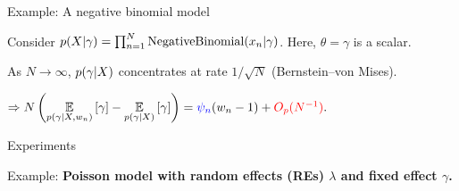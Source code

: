 

    



\begin{frame}[t]{Example: A negative binomial model}


Consider $p(X \vert \gamma) = \prod_{n=1}^N \textrm{NegativeBinomial}(x_n \vert \gamma)$. Here, $\theta = \gamma$ is a scalar.  

\pause
As $N \rightarrow \infty$, $p(\gamma \vert X)$ concentrates at rate $1 / \sqrt{N}$ (Bernstein--von Mises).

$\Rightarrow 
N \left( \underset{p(\gamma \vert X, w_n)}{\mathbb{E}}\left[\gamma\right] -
\underset{p(\gamma \vert X)}{\mathbb{E}}\left[\gamma\right] \right) = \textcolor{blue}{\psi_n} (w_n - 1) + \textcolor{red}{O_p(N^{-1})}.
$


\pause
\vspace{1.5em}
\LowDimAccuracyGraph{}

\pause
{}

\end{frame}



\begin{frame}{Experiments}

Example: \textbf{Poisson model with random effects (REs)
$\lambda$ and fixed effect $\gamma$.}

\HighDimAccuracyGraph{}

\end{frame}



